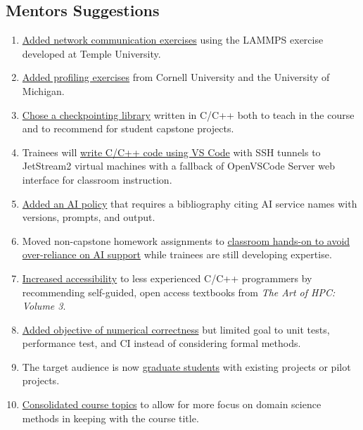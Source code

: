 \documentclass{article}
\newcommand{\sectionbox}[1]{%
  \begin{tcolorbox}[sharp corners,boxrule=0pt,colback=fh-blue,coltext=fh-gold]%
    \section*{#1\vphantom{Yy}}%
  \end{tcolorbox}%
}
\begin{document}
\begin{multicols}{2}
\begin{minipage}[c]{.77\linewidth}
    \end{minipage}


  \sectionbox{Mentors Suggestions}%
  \begin{multicols}{2}
    \begin{enumerate}
    \item \ul{Added network communication exercises} %
      using the LAMMPS exercise developed at Temple University.
    \item \ul{Added profiling exercises} %
      from Cornell University %
      and the University of Michigan.
    \item \ul{Chose a checkpointing library} %
      written in C/C++ %
      both to teach in the course %
      and to recommend for student capstone projects.
    \item Trainees will \ul{write C/C++ code using VS Code} %
      with SSH tunnels to JetStream2 virtual machines %
      with a fallback of OpenVSCode Server web interface %
      for classroom instruction.
    \item \ul{Added an AI policy} %
      that requires a bibliography %
      citing AI service names with versions, prompts, and output.
    \item Moved non-capstone homework assignments to %
      \ul{classroom hands-on to avoid over-reliance on AI support} %
      while trainees are still developing expertise.
    \item \ul{Increased accessibility} %
      to less experienced C/C++ programmers %
      by recommending self-guided, open access textbooks %
      from \emph{The Art of HPC: Volume 3}.
    \item \ul{Added objective of numerical correctness} %
      but limited goal to unit tests, performance test, and CI %
      instead of considering formal methods.
    \item The target audience is now \ul{graduate students} %
      with existing projects or pilot projects.
    \item \ul{Consolidated course topics} %
      to allow for more focus on domain science methods %
      in keeping with the course title.
    \end{enumerate}
  \end{multicols}


\end{multicols}
\end{document}

